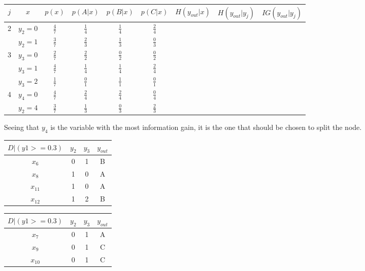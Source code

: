 \documentclass{article}
\begin{document}
\begin{enumerate}[leftmargin=\labelsep]
\begin{table}[H]
  \begin{tabular}{cc|ccccc|cc}
  $j$ & $x$                    & $p(x)$        & $p(A | x)$   & $p(B | x)$   & $p(C | x)$   & $H(y_{out}|x)$ & $H(y_{out}|y_j)$ & $IG(y_{out}|y_j)$ \\ \midrule
  \multirow{2}{*}{2} & $y_2=0$ & $\frac{4}{7}$ & $\frac{1}{4}$ & $\frac{1}{4}$ & $\frac{2}{4}$ &  & \\
   &                   $y_2=1$ & $\frac{3}{7}$ & $\frac{2}{3}$ & $\frac{1}{3}$ & $\frac{0}{3}$ &  & \\ \midrule
  \multirow{3}{*}{3} & $y_3=0$ & $\frac{2}{7}$ & $\frac{2}{2}$ & $\frac{0}{2}$ & $\frac{0}{2}$ &  & \\
   &                   $y_3=1$ & $\frac{4}{7}$ & $\frac{1}{4}$ & $\frac{1}{4}$ & $\frac{2}{4}$ &  & \\
   &                   $y_3=2$ & $\frac{1}{7}$ & $\frac{0}{1}$ & $\frac{1}{1}$ & $\frac{0}{1}$ &  & \\ \midrule
  \multirow{2}{*}{4} & $y_4=0$ & $\frac{4}{7}$ & $\frac{2}{4}$ & $\frac{2}{4}$ & $\frac{0}{4}$ &  & \\
   &                   $y_2=4$ & $\frac{3}{7}$ & $\frac{1}{3}$ & $\frac{0}{3}$ & $\frac{2}{3}$ &  & \\ \bottomrule
  \end{tabular}
\end{table}

Seeing that $y_4$ is the variable with the most information 
gain, it is the one that should be chosen to split the node.


\begin{minipage}{0.5\textwidth}
  \begin{table}[H]
    \centering
    \begin{tabular}{@{}cccc}
      $D | (y1 >= 0.3)$ & $y_2$ & $y_3$ & $y_{out}$ \\ \midrule
      $x_6$    & 0 & 1 & B \\
      $x_8$    & 1 & 0 & A \\
      $x_{11}$ & 1 & 0 & A \\
      $x_{12}$ & 1 & 2 & B \\
    \end{tabular}
  \end{table}
\end{minipage}
\begin{minipage}{0.5\textwidth}
  \begin{table}[H]
    \centering
    \begin{tabular}{@{}cccc}
      $D | (y1 >= 0.3)$ & $y_2$ & $y_3$ & $y_{out}$ \\ \midrule
      $x_7$    & 0 & 1 & A \\
      $x_9$    & 0 & 1 & C \\
      $x_{10}$ & 0 & 1 & C \\
    \end{tabular}
  \end{table}
\end{minipage}


\end{enumerate}
\end{document}
